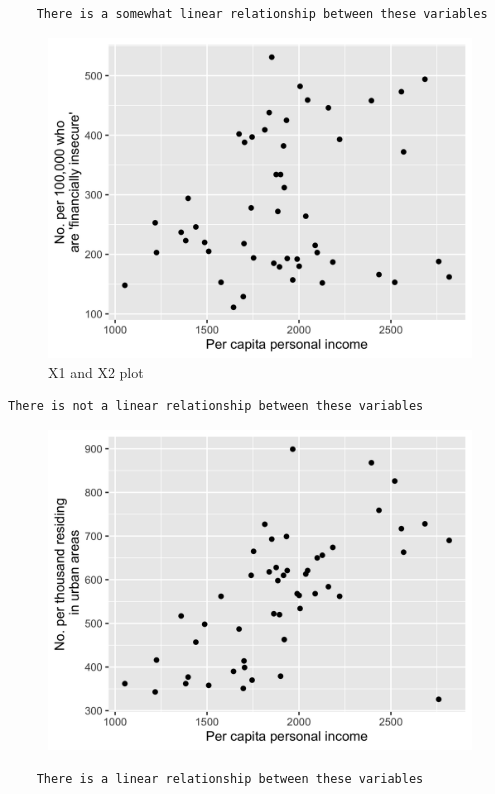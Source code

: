 \documentclass[12pt,letterpaper]{article}
\begin{document}
	\begin{verbatim}
	There is a somewhat linear relationship between these variables
\end{verbatim}
\vspace{.5cm}

	\begin{figure}[H]
	\centering
	\includegraphics[width=0.7\linewidth]{../plot4}
	\caption{X1 and X2 plot}
	\label{fig:plot4}
	\end{figure}

	\begin{verbatim}
There is not a linear relationship between these variables
\end{verbatim}

\begin{figure}[H]
	\centering
	\includegraphics[width=0.7\linewidth]{../plot5}
	\caption{}
	\label{fig:plot5}
\end{figure}

	\begin{verbatim}
	There is a linear relationship between these variables
\end{verbatim}
\end{document}
